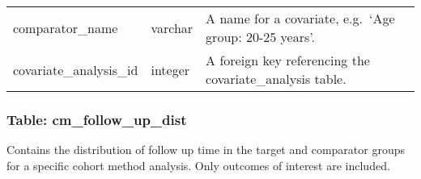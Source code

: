 \documentclass[
]{article}
\begin{document}
\begin{longtable}[]{@{}lll@{}}
\begin{minipage}[t]{0.23\columnwidth}
comparator\_name\strut
\end{minipage} & \begin{minipage}[t]{0.18\columnwidth}\raggedright
varchar\strut
\end{minipage} & \begin{minipage}[t]{0.50\columnwidth}\raggedright
A name for a covariate, e.g.~`Age group: 20-25 years'.\strut
\end{minipage}\tabularnewline
\begin{minipage}[t]{0.23\columnwidth}\raggedright
covariate\_analysis\_id\strut
\end{minipage} & \begin{minipage}[t]{0.18\columnwidth}\raggedright
integer\strut
\end{minipage} & \begin{minipage}[t]{0.50\columnwidth}\raggedright
A foreign key referencing the covariate\_analysis table.\strut
\end{minipage}\tabularnewline
\bottomrule
\end{longtable}

\hypertarget{table-cm_follow_up_dist}{%
\subsubsection{Table:
cm\_follow\_up\_dist}\label{table-cm_follow_up_dist}}

Contains the distribution of follow up time in the target and comparator
groups for a specific cohort method analysis. Only outcomes of interest
are included.
\end{document}
